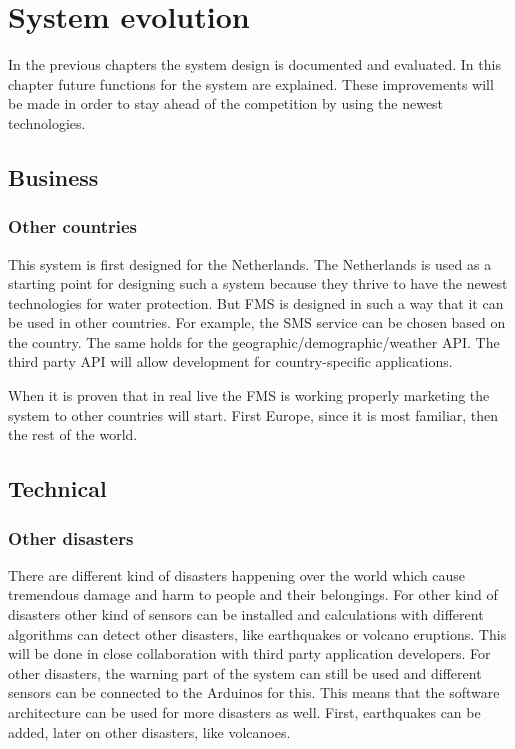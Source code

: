 \chapter{System evolution}

\label{ch:evolution}
In the previous chapters the system design is documented and evaluated. In this chapter future functions for the system are explained. These improvements will be made in order to stay ahead of the competition by using the newest technologies.

\section{Business}

\subsection{Other countries}
This system is first designed for the Netherlands. The Netherlands is used as a starting point for designing such a system because they thrive to have the newest technologies for water protection. But FMS is designed in such a way that it can be used in other countries. For example, the SMS service can be chosen based on the country. The same holds for the geographic/demographic/weather API.
The third party API will allow development for country-specific applications.

When it is proven that in real live the FMS is working properly marketing the system to other countries will start. First Europe, since it is most familiar, then the rest of the world.


\section{Technical}
\subsection{Other disasters}
There are different kind of disasters happening over the world which cause tremendous damage and harm to people and their belongings. For other kind of disasters other kind of sensors can be installed and calculations with different algorithms can detect other disasters, like earthquakes or volcano eruptions. This will be done in close collaboration with third party application developers.
For other disasters, the warning part of the system can still be used and different sensors can be connected to the Arduinos for this. This means that the software architecture can be used for more disasters as well.
First, earthquakes can be added, later on other disasters, like volcanoes.

